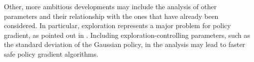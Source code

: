 Other, more ambitious developments may include the analysis of other parameters and their relationship with the ones that have already been considered.
In particular, exploration represents a major problem for policy gradient, as pointed out in \cite{kakade2002approximately}. Including exploration-controlling parameters, such as the standard deviation of the Gaussian policy, in the analysis may lead to faster safe policy gradient algorithms.